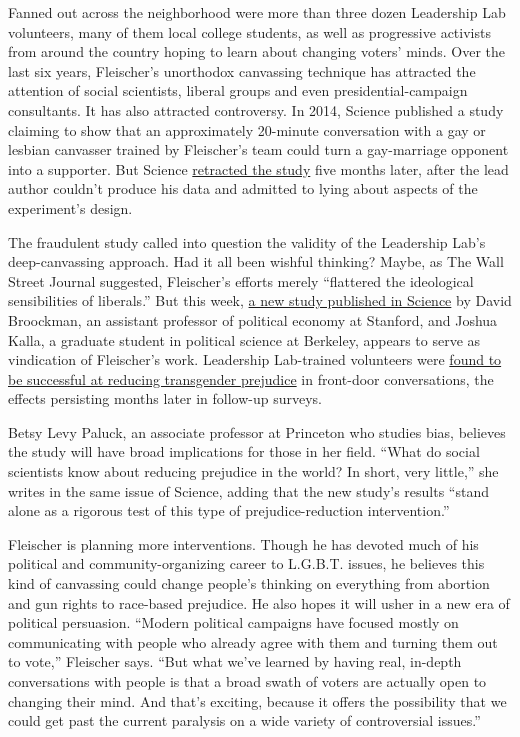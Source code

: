 Fanned out across the neighborhood were more than three dozen Leadership
Lab volunteers, many of them local college students, as well as
progressive activists from around the country hoping to learn about
changing voters' minds. Over the last six years, Fleischer's unorthodox
canvassing technique has attracted the attention of social scientists,
liberal groups and even presidential-campaign consultants. It has also
attracted controversy. In 2014, Science published a study claiming to
show that an approximately 20-minute conversation with a gay or lesbian
canvasser trained by Fleischer's team could turn a gay-marriage opponent
into a supporter. But Science
\href{http://science.sciencemag.org/content/early/2015/05/27/science.aac6638}{retracted
the study} five months later, after the lead author couldn't produce his
data and admitted to lying about aspects of the experiment's design.

The fraudulent study called into question the validity of the Leadership
Lab's deep-canvassing approach. Had it all been wishful thinking? Maybe,
as The Wall Street Journal suggested, Fleischer's efforts merely
``flattered the ideological sensibilities of liberals.'' But this week,
\href{http://science.sciencemag.org/cgi/doi/10.1126/science.aad9713}{a
new study published in Science} by David Broockman, an assistant
professor of political economy at Stanford, and Joshua Kalla, a graduate
student in political science at Berkeley, appears to serve as
vindication of Fleischer's work. Leadership Lab-trained volunteers were
\href{http://www.nytimes3xbfgragh.onion/2016/04/08/science/doorstep-canvassing-can-shift-views-on-transgender-rights-study-finds.html}{found
to be successful at reducing transgender prejudice} in front-door
conversations, the effects persisting months later in follow-up surveys.

Betsy Levy Paluck, an associate professor at Princeton who studies bias,
believes the study will have broad implications for those in her field.
``What do social scientists know about reducing prejudice in the world?
In short, very little,'' she writes in the same issue of Science, adding
that the new study's results ``stand alone as a rigorous test of this
type of prejudice-reduction intervention.''

Fleischer is planning more interventions. Though he has devoted much of
his political and community-organizing career to L.G.B.T. issues, he
believes this kind of canvassing could change people's thinking on
everything from abortion and gun rights to race-based prejudice. He also
hopes it will usher in a new era of political persuasion. ``Modern
political campaigns have focused mostly on communicating with people who
already agree with them and turning them out to vote,'' Fleischer says.
``But what we've learned by having real, in-depth conversations with
people is that a broad swath of voters are actually open to changing
their mind. And that's exciting, because it offers the possibility that
we could get past the current paralysis on a wide variety of
controversial issues.''

